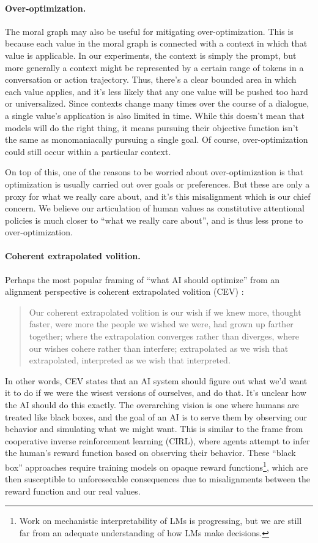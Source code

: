 \documentclass{article}
\theoremstyle{definition}
\begin{document}
\paragraph{Over-optimization.} The moral graph may also be useful for mitigating over-optimization. This is because each value in the moral graph is connected with a context in which that value is applicable. In our experiments, the context is simply the prompt, but more generally a context might be represented by a certain range of tokens in a conversation or action trajectory. Thus, there’s a clear bounded area in which each value applies, and it’s less likely that any one value will be pushed too hard or universalized. Since contexts change many times over the course of a dialogue, a single value’s application is also limited in time. While this doesn’t mean that models will do the right thing, it means pursuing their objective function isn’t the same as monomaniacally pursuing a single goal. Of course, over-optimization could still occur within a particular context. 

On top of this, one of the reasons to be worried about over-optimization is that optimization is usually carried out over goals or preferences. But these are only a proxy for what we really care about, and it’s this misalignment which is our chief concern. We believe our articulation of human values as constitutive attentional policies is much closer to “what we really care about”, and is thus less prone to over-optimization.

\paragraph{Coherent extrapolated volition.} Perhaps the most popular framing of “what AI should optimize” from an alignment perspective is coherent extrapolated volition (CEV) \citep{Yudkowsky2001-YUDCEV}:

\begin{quote}
Our coherent extrapolated volition is our wish if we knew more, thought faster, were more the people we wished we were, had grown up farther together; where the extrapolation converges rather than diverges, where our wishes cohere rather than interfere; extrapolated as we wish that extrapolated, interpreted as we wish that interpreted.
\end{quote}

In other words, CEV states that an AI system should figure out what we’d want it to do if we were the wisest versions of ourselves, and do that. It’s unclear how the AI should do this exactly. The overarching vision is one where humans are treated like black boxes, and the goal of an AI is to serve them by observing our behavior and simulating what we might want. This is similar to the frame from cooperative inverse reinforcement learning (CIRL), where agents attempt to infer the human’s reward function based on observing their behavior. These “black box” approaches require training models on opaque reward functions\footnote{ Work on mechanistic interpretability of LMs is progressing, but we are still far from an adequate understanding of how LMs make decisions.  }, which are then susceptible to unforeseeable consequences due to misalignments between the reward function and our real values.
\end{document}

